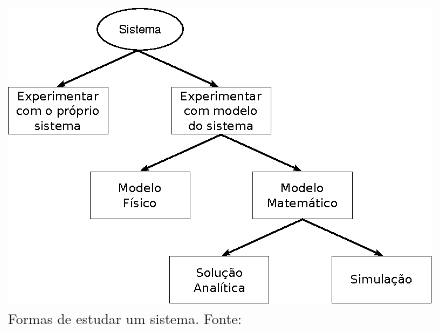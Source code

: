 \begin{figure}[htb!]
\centering\includegraphics{img/systemstudy.eps}
\caption{\label{fig:systemstudy}Formas de estudar um sistema. Fonte:~\cite{Law}}
\end{figure}

